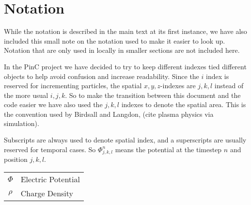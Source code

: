 \section{Notation}
  While the notation is described in the main text at its first instance, we have also included
  this small note on the notation used to make it easier to look up.
  Notation that are only used in locally in smaller sections are not included here.

  In the PinC project we have decided to try to keep different indexes tied different
  objects to help avoid confusion and increase readability. Since the \(i\) index is
  reserved for incrementing particles, the spatial \(x,y,z\)-indexes are \(j,k,l\) instead of the
  more usual \(i,j,k\). So to make the transition between this document and the code
  easier we have also used the \(j,k,l\) indexes to denote the spatial area.
  This is the convention used by Birdsall and Langdon, (cite plasma physics via simulation).

  Subscripts are always used to denote spatial index, and a superscripts are usually
  reserved for temporal cases. So \( \Phi^n_{j,k,l} \) means the potential at
  the timestep \(n\) and position \(j,k,l\).


  \begin{centering}
    \begin{tabular}{c |l}
      \(\Phi\) & Electric Potential
      \\
      \(\rho\) & Charge Density
      \\

    \end{tabular}
  \end{centering}
